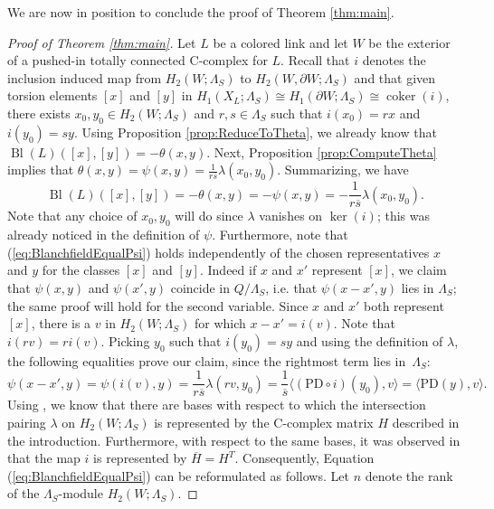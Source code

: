 \documentclass[11pt,a4paper]{amsart}
\theoremstyle{definition}
\DeclareMathOperator{\coker}{coker}
\def\op{\operatorname}
\begin{document}
We are now in position to conclude the proof of Theorem \ref{thm:main}. 

\begin{proof}[\textit{Proof of Theorem \ref{thm:main}}]
Let $L$ be a colored link and let $W$ be the exterior of a pushed-in totally connected C-complex for $L$. Recall that $i$ denotes the inclusion induced map from $H_2(W;\Lambda_S)$ to $H_2(W,\partial W;\Lambda_S)$ and that given torsion elements $[x]$ and $[y]$ in $ H_1(X_L;\Lambda_S) \cong H_1(\partial W;\Lambda_S) \cong \coker(i)$, there exists $x_0,y_0 \in H_2(W;\Lambda_S)$ and $r,s \in \Lambda_S$ such that $i(x_0)=r x$ and $i(y_0)=s y$. 
Using Proposition \ref{prop:ReduceToTheta}, we already know that $\op{Bl}(L)([x],[y])=-\theta(x,y)$. Next, Proposition \ref{prop:ComputeTheta} implies that $\theta(x,y)=\psi(x,y)=\frac{1}{r\overline{s}}\lambda(x_0,y_0)$. Summarizing, we have
\begin{equation}
\label{eq:BlanchfieldEqualPsi}
 \op{Bl}(L)([x],[y])=-\theta(x,y)=-\psi(x,y)=-\frac{1}{r\overline{s}}\lambda(x_0,y_0).
 \end{equation}
Note that any choice of $x_0,y_0$ will do since $\lambda$ vanishes on $\ker(i)$; this was already noticed in the definition of $\psi$. Furthermore, note that (\ref{eq:BlanchfieldEqualPsi}) holds independently of the chosen representatives $x$ and $y$ for the classes $[x]$ and $[y]$. 
Indeed if $x$ and $x'$ represent $[x]$, we claim that $\psi(x,y)$ and $\psi(x',y)$ coincide in $Q/\Lambda_S$, i.e. that $\psi(x-x',y)$ lies in $\Lambda_S$; the same proof will hold for the second variable. 
Since $x$ and $x'$ both represent $[x]$, there is a $v$ in $H_2(W;\Lambda_S)$ for which $x-x'=i(v)$. 
Note that $i(r v)=r i(v)$. 
Picking $y_0$ such that $i(y_0)=s y$ and using the definition of $\lambda$, the following equalities prove our claim, since the rightmost term lies in~$\Lambda_S$:
$$ \psi(x-x',y)= \psi(i(v),y)=\frac{1}{r\overline{s}} \lambda(r v, y_0)=\frac{1}{\overline{s}} \langle (\text{PD} \circ i)(y_0),v \rangle=\langle \text{PD}(y),v \rangle.$$
Using \cite[Theorem 1.3]{ConwayFriedlToffoli}, we know that there are bases with respect to which the intersection pairing $\lambda$ on $H_2(W;\Lambda_S)$ is represented by the C-complex matrix $H$ described in the introduction. Furthermore, with respect to the same bases, it was observed in \cite[Section 5.2]{ConwayFriedlToffoli} that the map $i$ is represented by $\overline{H}=H^T$. Consequently, Equation (\ref{eq:BlanchfieldEqualPsi}) can be reformulated as follows. 
Let $n$ denote the rank of the $\Lambda_S$-module $H_2(W;\Lambda_S)$. 

\end{proof}
\end{document}
